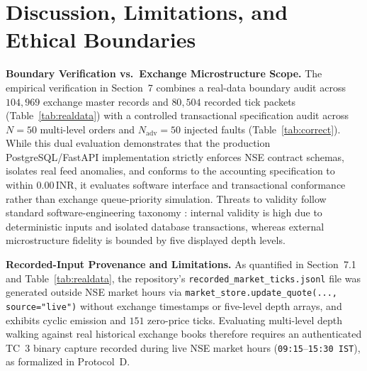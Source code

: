 \documentclass[12pt]{article}
\newcommand{\thinunit}[2]{#1\,\text{#2}}
\begin{document}
\section{Discussion, Limitations, and Ethical Boundaries}

\textbf{Boundary Verification vs.\ Exchange Microstructure Scope.} The empirical verification in Section~7 combines a real-data boundary audit across $104{,}969$ exchange master records and $80{,}504$ recorded tick packets (Table~\ref{tab:realdata}) with a controlled transactional specification audit across $N=50$ multi-level orders and $N_{\mathrm{adv}}=50$ injected faults (Table~\ref{tab:correct}). While this dual evaluation demonstrates that the production PostgreSQL/FastAPI implementation strictly enforces NSE contract schemas, isolates real feed anomalies, and conforms to the accounting specification to within $\thinunit{0.00}{INR}$, it evaluates software interface and transactional conformance rather than exchange queue-priority simulation. Threats to validity follow standard software-engineering taxonomy \cite{wohlin2012}: internal validity is high due to deterministic inputs and isolated database transactions, whereas external microstructure fidelity is bounded by five displayed depth levels.

\textbf{Recorded-Input Provenance and Limitations.} As quantified in Section~7.1 and Table~\ref{tab:realdata}, the repository's \texttt{recorded\_market\_ticks.jsonl} file was generated outside NSE market hours via \texttt{market\_store.update\_quote(..., source="live")} without exchange timestamps or five-level depth arrays, and exhibits cyclic emission and $151$ zero-price ticks. Evaluating multi-level depth walking against real historical exchange books therefore requires an authenticated TC~3 binary capture recorded during live NSE market hours (\texttt{09:15}--\texttt{15:30~IST}), as formalized in Protocol~D.
\end{document}
